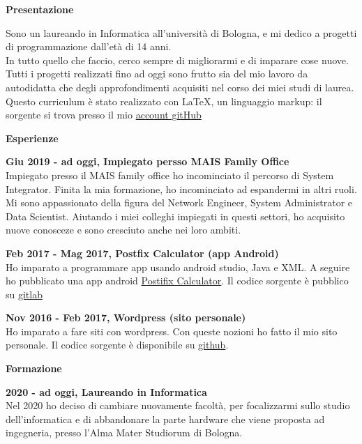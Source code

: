 \documentclass[a4paper,12pt,final]{memoir}
\newcommand{\Sep}{\vspace{1.5em}}
\newcommand{\SmallSep}{\vspace{0.5em}}
\newcommand{\CVSection}[1]
	{\Large\textbf{#1}\par
	\SmallSep\normalsize\normalfont}
\newcommand{\CVItem}[1]
	{\textbf{\color{RoyalBlue} #1}}
\begin{document}
\normalsize\normalfont

\CVSection{Presentazione}
    Sono un laureando in Informatica all'università di Bologna, e mi dedico a progetti di programmazione dall'età di 14 anni.\\
	In tutto quello che faccio, cerco sempre di migliorarmi e di imparare cose nuove.
	Tutti i progetti realizzati fino ad oggi sono frutto sia del mio lavoro da autodidatta che degli approfondimenti acquisiti nel corso dei miei studi di laurea.
	\\Questo curriculum è stato realizzato con \LaTeX, un linguaggio markup:
	il sorgente si trova presso il mio \href{https://github.com/Mot93/CV-Mattia-Rubini}{account gitHub}\\
\Sep


\CVSection{Esperienze}

\CVItem{Giu 2019 - ad oggi, Impiegato persso MAIS Family Office}\\
	Impiegato presso il MAIS family office ho incominciato il percorso di System Integrator. 
	Finita la mia formazione, ho incominciato ad espandermi in altri ruoli. 
	Mi sono appassionato della figura del Network Engineer, System Administrator e Data Scientist.
	Aiutando i miei colleghi impiegati in questi settori, ho acquisito nuove conosceze e sono cresciuto anche nei loro ambiti.

\SmallSep

\CVItem{Feb 2017 - Mag 2017, Postfix Calculator (app Android)}\\
	Ho imparato a programmare app usando android studio, Java e XML. 
	A seguire ho pubblicato una app android \href{https://play.google.com/store/apps/details?id=postfixcalculator.mattiarubini.com.postfixcalculator}{ Postifix Calculator}.
	Il codice sorgente è pubblico su \href{https://gitlab.com/mattia.rubini/PostfixCalculator}{gitlab}
\SmallSep

\CVItem{Nov 2016 - Feb 2017, Wordpress (sito personale)}\\
	Ho imparato a fare siti con wordpress. 
	Con queste nozioni ho fatto il mio sito personale. Il codice sorgente è disponibile su \href{https://github.com/Mot93/MattiaRubini-com-wordpress-theme}{github}.
\Sep

\CVSection{Formazione}

\CVItem{2020 - ad oggi, Laureando in Informatica}\\
	Nel 2020 ho deciso di cambiare nuovamente facoltà, per focalizzarmi sullo studio dell'informatica e di abbandonare la parte hardware che viene proposta ad ingegneria,
	presso l'Alma Mater Studiorum di Bologna.
\SmallSep
\end{document}
